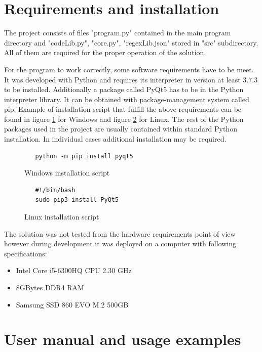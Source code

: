 \documentclass[a4paper,twoside,12pt]{book}
\begin{document}
\section{Requirements and installation}

The project consists of files "program.py" contained in the main program directory and
"codeLib.py", "core.py", "regexLib.json" stored in "src" subdirectory. All of them are 
required for the proper operation of the solution.

For the program to work correctly, some software requirements have to be meet. It was developed with 
Python and requires its interpreter in version at least 3.7.3 to be installed. Additionally a package called PyQt5 has 
to be in the Python interpreter library. It can be obtained with package-management 
system called pip. Example of installation script that fulfill the above requirements can be found
in figure \ref{fig:windowsScript} for Windows and figure \ref{fig:linuxScript} for Linux.
The rest of the Python packages used in the project are usually contained within standard Python installation.
In individual cases additional installation may be required.

\begin{figure}
   \centering
   \begin{lstlisting}
   python -m pip install pyqt5
   \end{lstlisting}
   \caption{Windows installation script}
   \label{fig:windowsScript}
\end{figure}

\begin{figure}
   \centering
   \begin{lstlisting}
   #!/bin/bash
   sudo pip3 install PyQt5
   \end{lstlisting}
   \caption{Linux installation script}
   \label{fig:linuxScript}
\end{figure}

The solution was not tested from the hardware requirements point of view however 
during development it was deployed on a computer with following specifications:

\begin{itemize}
   \item Intel Core i5-6300HQ CPU 2.30 GHz
   \item 8GBytes DDR4 RAM
   \item Samsung SSD 860 EVO M.2 500GB
\end{itemize}

\section{User manual and usage examples}
\end{document}
